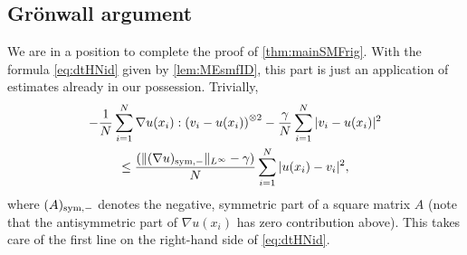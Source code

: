 \documentclass[10pt]{amsart}
\newcommand{\sym}{\textup{sym}}
\theoremstyle{plain}
\theoremstyle{definition}
\DeclarePairedDelimiter{\pa}{\lparen}{\rparen}
\let\ga\gamma
\let\nab\nabla
\begin{document}
\subsection{Grönwall argument}\label{ssec:MPgron}
We are in a position to complete the proof of \cref{thm:mainSMFrig}. With the formula \eqref{eq:dtHNid} given by \cref{lem:MEsmfID}, this part is just an application of estimates already in our possession.
Trivially,\vspace*{-8pt}
\begin{multline}\label{eq:LGronkin}
-\frac{1}{N}\sum_{i=1}^N \nab u(x_i) : \pa*{v_i - u(x_i)}^{\otimes 2} -\frac{\ga}{N}\sum_{i=1}^N |v_i-u(x_i)|^2 \\
\leq \frac{(\|(\nabla u)_{\sym,-}\|_{L^\infty}-\ga)}{N}\sum_{i=1}^N |u(x_i)-v_i|^2,
\end{multline}
where $(A)_{\sym,-}$ denotes the negative, symmetric part of a square matrix $A$ (note that the antisymmetric part of $\nab u(x_i)$ has zero contribution above). This takes care of the first line on the right-hand side of \eqref{eq:dtHNid}.
\end{document}
